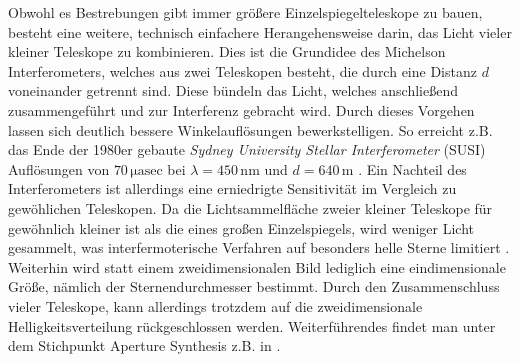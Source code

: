 Obwohl es Bestrebungen gibt immer größere Einzelspiegelteleskope zu bauen, besteht eine weitere, technisch einfachere Herangehensweise darin, das Licht vieler kleiner Teleskope zu kombinieren. 
Dies ist die Grundidee des Michelson Interferometers, welches aus zwei Teleskopen besteht, die durch eine Distanz $d$ voneinander getrennt sind. 
Diese bündeln das Licht, welches anschließend zusammengeführt und zur Interferenz gebracht wird. 
Durch dieses Vorgehen lassen sich deutlich bessere Winkelauflösungen bewerkstelligen. 
So erreicht z.B. das Ende der 1980er gebaute \emph{Sydney University Stellar Interferometer} (SUSI) Auflösungen von $70\,\mathrm{\mu asec}$ bei $\lambda=450\,\mathrm{nm}$ und $d=640\,\mathrm{m}$ \cite{davisSydneyUniversityStellar1999}. 
Ein Nachteil des Interferometers ist allerdings eine erniedrigte Sensitivität im Vergleich zu gewöhlichen Teleskopen. 
Da die Lichtsammelfläche zweier kleiner Teleskope für gewöhnlich kleiner ist als die eines großen Einzelspiegels, wird weniger Licht gesammelt, was interfermoterische Verfahren auf besonders helle Sterne limitiert \cite{foxQuantumOpticsIntroduction2006}. 
Weiterhin wird statt einem zweidimensionalen Bild lediglich eine eindimensionale Größe, nämlich der Sternendurchmesser bestimmt. 
Durch den Zusammenschluss vieler Teleskope, kann allerdings trotzdem auf die zweidimensionale Helligkeitsverteilung rückgeschlossen werden. 
Weiterführendes findet man unter dem  Stichpunkt \glqq Aperture Synthesis \grqq z.B. in \cite[Kap. 10]{burkeIntroductionRadioAstronomy2019}. \\

